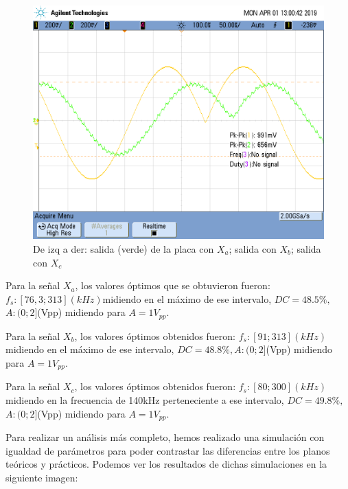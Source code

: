 \documentclass[../../ASSD_TP1_G7.tex]{subfiles}
\begin{document}
\begin{figure}[H]
\centering{}\includegraphics[scale=0.25]{Imagenes/ej_6_}\caption{De izq a der: salida (verde) de la placa con $X_{a}$; salida con
$X_{b}$; salida con $X_{c}$}
\end{figure}

Para la señal $X_{a}$, los valores óptimos que se obtuvieron fueron:
$f_{s}:[76,3;313](kHz)$midiendo en el máximo de ese intervalo, $DC=48.5\%,$$A:(0;2]$(Vpp)
midiendo para $A=1V_{pp}$.

Para la señal $X_{b}$, los valores óptimos obtenidos fueron: $f_{s}:[91;313](kHz)$midiendo
en el máximo de ese intervalo, $DC=48.8\%,$$A:(0;2]$(Vpp) midiendo
para $A=1V_{pp}$.

Para la señal $X_{c}$, los valores óptimos obtenidos fueron: $f_{s}:[80;300](kHz)$midiendo
en la frecuencia de 140kHz perteneciente a ese intervalo, $DC=49.8\%,$$A:(0;2]$(Vpp)
midiendo para $A=1V_{pp}$.

Para realizar un análisis más completo, hemos realizado una simulación
con igualdad de parámetros para poder contrastar las diferencias entre
los planos teóricos y prácticos. Podemos ver los resultados de dichas
simulaciones en la siguiente imagen:
\end{document}
